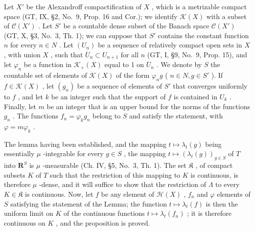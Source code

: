 Let \(X'\) be the Alexandroff compactification of \(X\) , which is a metrizable compact space (GT, IX, §2, No.~9, Prop. 16 and Cor.); we identify \(\mathcal{K}(X)\) with a subset of \(\mathcal{C}(X')\) . Let \(S'\) be a countable dense subset of the Banach space \(\mathcal{C}(X')\) (GT, X, §3, No.~3, Th. 1); we can suppose that \(S'\) contains the constant function \(n\) for every \(n \in N\) . Let \((U_n)\) be a sequence of relatively compact open sets in \(X\) , with union \(X\) , such that \(\overline{U}_n \subset U_{n+1}\) for all \(n\) (GT, I, §9, No.~9, Prop. 15), and let \(\varphi_n\) be a function in \(\mathcal{K}_+(X)\) equal to 1 on \(\overline{U}_n\) . We denote by \(S\) the countable set of elements of \(\mathcal{K}(X)\) of the form \(\varphi_n g\) ( \(n \in N, g \in S'\) ). If \(f \in \mathcal{K}(X)\) , let \((g_n)\) be a sequence of elements of \(S'\) that converges uniformly to \(f\) , and let \(k\) be an integer such that the support of \(f\) is contained in \(U_k\) . Finally, let \(m\) be an integer that is an upper bound for the norms of the functions \(g_n\) . The functions \(f_n = \varphi_k g_n\) belong to \(S\) and satisfy the statement, with \(\varphi = m\varphi_k\) .

The lemma having been established, and the mapping \(t \mapsto \lambda_t(g)\) being essentially \(\mu\) -integrable for every \(g \in S\) , the mapping \(t \mapsto (\lambda_t(g))_{g \in S}\) of \(T\) into \(\mathbf{R}^S\) is \(\mu\) -measurable (Ch. IV, §5, No.~3, Th. 1). The set \(\mathfrak{K}\) , of compact subsets \(K\) of \(T\) such that the restriction of this mapping to \(K\) is continuous, is therefore \(\mu\) -dense, and it will suffice to show that the restriction of \(\Lambda\) to every \(K \in \mathfrak{K}\) is continuous. Now, let \(f\) be any element of \(\mathcal{H}(X)\) , \(f_n\) and \(\varphi\) elements of \(S\) satisfying the statement of the Lemma; the function \(t \mapsto \lambda_t(f)\) is then the uniform limit on \(K\) of the continuous functions \(t \mapsto \lambda_t(f_n)\) ; it is therefore continuous on \(K\) , and the proposition is proved.
\relax{}
